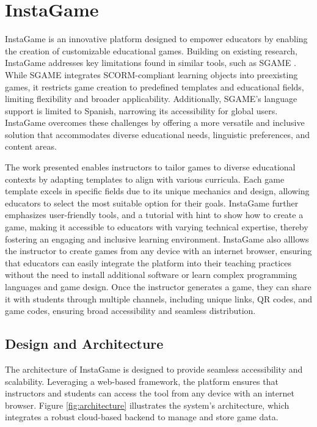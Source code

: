 \chapter{InstaGame}\label{chap:method}


InstaGame is an innovative platform designed to empower educators by enabling the creation of customizable educational games. Building on existing research, InstaGame addresses key limitations found in similar tools, such as SGAME \cite{sgame2020}. While SGAME integrates SCORM-compliant learning objects into preexisting games, it restricts game creation to predefined templates and educational fields, limiting flexibility and broader applicability. Additionally, SGAME's language support is limited to Spanish, narrowing its accessibility for global users. InstaGame overcomes these challenges by offering a more versatile and inclusive solution that accommodates diverse educational needs, linguistic preferences, and content areas.

The work presented enables instructors to tailor games to diverse educational contexts by adapting templates to align with various curricula. Each game template excels in specific fields due to its unique mechanics and design, allowing educators to select the most suitable option for their goals. InstaGame further emphasizes user-friendly tools, and a tutorial with hint to show how to create a game, making it accessible to educators with varying technical expertise, thereby fostering an engaging and inclusive learning environment. InstaGame also alllows the instructor to create games from any device with an internet browser, ensuring that educators can easily integrate the platform into their teaching practices without the need to install additional software or learn complex programming languages and game design. Once the instructor generates a game, they can share it with students through multiple channels, including unique links, QR codes, and game codes, ensuring broad accessibility and seamless distribution.

\section{Design and Architecture}

The architecture of InstaGame is designed to provide seamless accessibility and scalability. Leveraging a web-based framework, the platform ensures that instructors and students can access the tool from any device with an internet browser. Figure \ref{fig:architecture} illustrates the system’s architecture, which integrates a robust cloud-based backend to manage and store game data.

